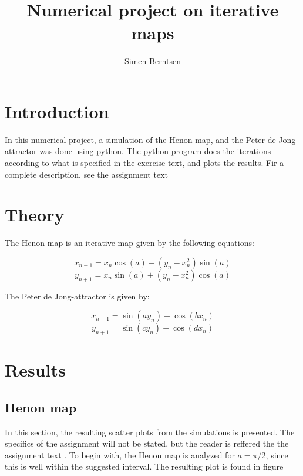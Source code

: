 \documentclass{article}
\title{Numerical project on iterative maps}
\author{Simen Berntsen}
\begin{document}
\maketitle



\section{Introduction}
In this numerical project, a simulation of the Henon map, and the Peter de Jong-attractor was done using python. The python program does the iterations according to what is specified in the exercise text, and plots the results. Fir a complete description, see the assignment text \cite{ex_text}

\section{Theory}

The Henon map is an iterative map given by the following equations:

\begin{equation}
x_{n+1} = x_{n}\cos(a) - (y_{n} - x_n^2)\sin(a)
\end{equation}
\begin{equation}
y_{n+1} = x_{n}\sin(a) + (y_{n} - x_n^2)\cos(a)
\end{equation}

The Peter de Jong-attractor is given by:

\begin{equation}
x_{n+1} = \sin(ay_n) - \cos(bx_n)
\end{equation}
\begin{equation}
y_{n+1} = \sin(cy_n) - \cos(dx_n)
\end{equation}

\section{Results}
\subsection{Henon map}
In this section, the resulting scatter plots from the simulations is presented. The specifics of the assignment will not be stated, but the reader is reffered the the assignment text \cite{ex_text}. To begin with, the Henon map is analyzed for $ a = \pi/2$, since this is well within the suggested interval. The resulting plot is found in figure 
\end{document}
